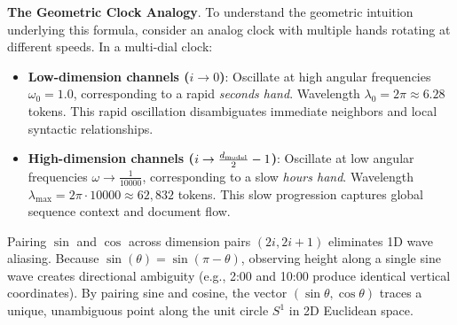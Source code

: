 \documentclass[../../main.tex]{subfiles}
\begin{document}
\noindent\textbf{The Geometric Clock Analogy}.\newline
To understand the geometric intuition underlying this formula, consider an analog clock with multiple hands rotating at different speeds. In a multi-dial clock:
\begin{itemize}
    \item \textbf{Low-dimension channels ($i \to 0$)}: Oscillate at high angular frequencies $\omega_0 = 1.0$, corresponding to a rapid \emph{seconds hand}. Wavelength $\lambda_0 = 2\pi \approx 6.28$ tokens. This rapid oscillation disambiguates immediate neighbors and local syntactic relationships.
    \item \textbf{High-dimension channels ($i \to \frac{d_{\text{model}}}{2}-1$)}: Oscillate at low angular frequencies $\omega \to \frac{1}{10000}$, corresponding to a slow \emph{hours hand}. Wavelength $\lambda_{\max} = 2\pi \cdot 10000 \approx 62{,}832$ tokens. This slow progression captures global sequence context and document flow.
\end{itemize}

Pairing $\sin$ and $\cos$ across dimension pairs $(2i, 2i+1)$ eliminates 1D wave aliasing. Because $\sin(\theta) = \sin(\pi - \theta)$, observing height along a single sine wave creates directional ambiguity (e.g., 2:00 and 10:00 produce identical vertical coordinates). By pairing sine and cosine, the vector $(\sin \theta, \cos \theta)$ traces a unique, unambiguous point along the unit circle $S^1$ in 2D Euclidean space.
\end{document}
